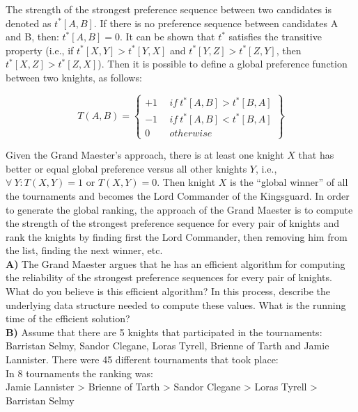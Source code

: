 \documentclass{article}
\begin{document}
\noindent The strength of the strongest preference sequence between
two candidates is denoted as $t^*[A,B]$. If there is no preference
sequence between candidates A and B, then: $t^*[A,B] = 0$. It can be
shown that $t^*$ satisfies the transitive property (i.e., if $t^*[X,Y]
> t^*[Y,X]$ and $t^*[Y,Z] > t^*[Z,Y]$, then $t^*[X,Z] >
t^*[Z,X]$). Then it is possible to define a global preference function
between two knights, as follows:\vspace{-.2in}

\begin{equation*}
T(A,B)=\left\{
\begin{matrix}+1\ &\ if\ t^*[A,B]>t^*[B,A]\\
-1\ &\ if\ t^*[A,B]<t^*[B,A]\\
0\ &\ otherwise
\end{matrix}
\right\}
\end{equation*}

\noindent Given the Grand Maester's approach, there is at least one
knight $X$ that has better or equal global preference versus all other
knights $Y$, i.e., $\forall\ Y: T(X,Y) = 1$ or $T(X,Y)=0$. Then knight
$X$ is the ``global winner'' of all the tournaments and becomes the
Lord Commander of the Kingsguard.  In order to generate the global
ranking, the approach of the Grand Maester is to compute the strength
of the strongest preference sequence for every pair of knights and
rank the knights by finding first the Lord Commander, then removing
him from the list, finding the next winner, etc.\\

\noindent \textbf{A)} The Grand Maester argues that he has an
efficient algorithm for computing the reliability of the strongest
preference sequences for every pair of knights. What do you believe is
this efficient algorithm? In this process, describe the underlying
data structure needed to compute these values. What is the running
time of the efficient solution?\\

\noindent \textbf{B)} Assume that there are 5 knights that
participated in the tournaments: Barristan Selmy, Sandor Clegane,
Loras Tyrell, Brienne of Tarth and Jamie Lannister. There were 45
different tournaments that took place:\\

\noindent In 8 tournaments the ranking was:\\ Jamie Lannister > Brienne of Tarth
> Sandor Clegane > Loras Tyrell > Barristan Selmy\\
\end{document}

